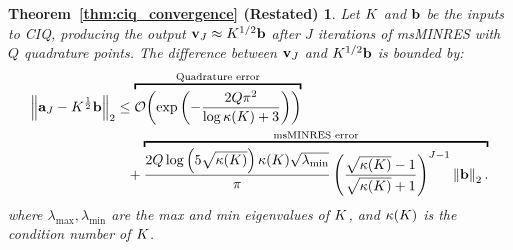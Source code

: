 






\newtheorem*{ciq_convergence}{Theorem~\ref{thm:ciq_convergence} (Restated)}
\begin{ciq_convergence}
  Let $K$ and $\mathbf{b}$ be the inputs to CIQ, producing the output $\mathbf{v}_J \approx K^{1/2} \mathbf{b}$ after $J$ iterations of msMINRES with $Q$ quadrature points.
  The difference between $\mathbf{v}_J$ and $K^{1/2} \mathbf{b}$ is bounded by:
  \begin{align*}
    \left\Vert \ba_J - \bK^{\frac 1 2} \bb \right\Vert_2
    &\leq
    \overbracket{
      \bigo{\exp\left( -\frac  {2 Q \pi^2}{\log \kappa(\bK) + 3} \right)}
    }^{\text{Quadrature error}}
    \\
    &\phantom{=} +
    \overbracket{
      \frac{ 2 Q \log \left( 5 \sqrt{\kappa(\bK)} \right)  \kappa(\bK) \sqrt{\lambda_\text{min}} } { \pi }
      \left( \frac{ \sqrt{\kappa(\bK)} - 1}{ \sqrt{\kappa(\bK)} + 1} \right)^{J-1}
      \left\Vert \bb \right\Vert_2.
    }^{\text{msMINRES error}}
  \end{align*}
  where $\lambda_\text{max},\lambda_{\text{min}}$ are the max and min eigenvalues of $K$, and $\kappa(K)$ is the condition number of $K$.
\end{ciq_convergence}
%
